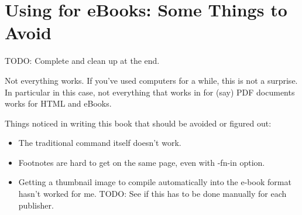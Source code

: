 \chapter{Using \latex for eBooks: Some Things to Avoid}

TODO: Complete and clean up at the end.

Not everything works. If you've used computers for a while, this is not a surprise. In particular in this case,
not everything that works in \latex for (say) PDF documents works for HTML and eBooks.

Things noticed in writing this book that should be avoided or figured out:

\begin{itemize}
    \item The traditional \latex command itself doesn't work.
    \item Footnotes are hard to get on the same page, even with -fn-in option.
    \item Getting a thumbnail image to compile automatically into the e-book format hasn't worked for me.
      TODO: See if this has to be done manually for each publisher.
\end{itemize}



